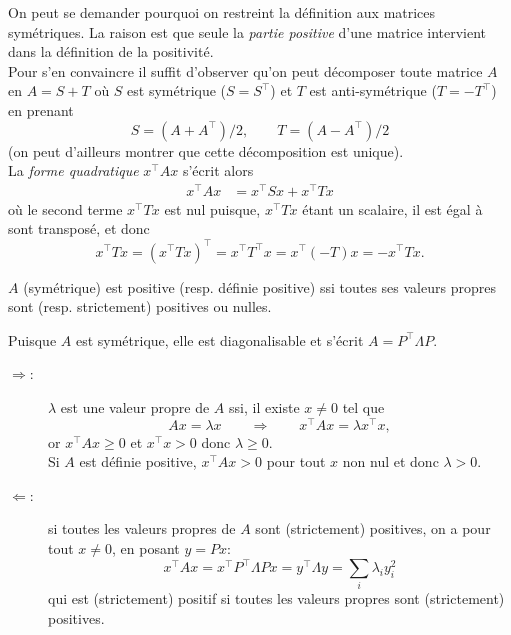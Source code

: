 \remark
On peut se demander pourquoi on restreint la définition aux matrices symétriques. La raison est que seule la {\em partie positive} d'une matrice intervient dans la définition de la positivité. \\
Pour s'en convaincre il suffit d'observer qu'on peut décomposer toute matrice $A$  en $A = S + T$ où $S$ est symétrique ($S = S^\top$) et $T$ est anti-symétrique ($T = -T^\top$) en prenant
$$
S = (A + A^\top) / 2, \qquad T = (A - A^\top) / 2
$$
(on peut d'ailleurs montrer que cette décomposition est unique). \\
La {\em forme quadratique} $x^\top A x$ s'écrit alors
\begin{align*}
  x^\top A x 
  & = x^\top S x + x^\top T x 
\end{align*}
où le second terme $x^\top T x$ est nul puisque, $x^\top T x$ étant un scalaire, il est égal à sont transposé, et donc
$$
x^\top T x = (x^\top T x)^\top = x^\top T^\top x = x^\top (- T) x = - x^\top T x.
$$

\begin{proposition}
  $A$ (symétrique) est positive (resp. définie positive) ssi toutes ses valeurs propres sont (resp. strictement) positives ou nulles. 
\end{proposition}

\proof
Puisque $A$ est symétrique, elle est diagonalisable et s'écrit $A = P^\top \Lambda P$.
\begin{description}
  \item[$\Rightarrow$:] $\lambda$ est une valeur propre de $A$ ssi, il existe $x \neq 0$ tel que
  $$
  Ax = \lambda x \qquad \Rightarrow \qquad x^\top A x = \lambda x^\top x,
  $$
  or $x^\top A x \geq 0$ et $x^\top x > 0$ donc $\lambda \geq 0$. \\
  Si $A$ est définie positive, $x^\top A x > 0$ pour tout $x$ non nul et donc $\lambda > 0$.
  \item[$\Leftarrow$:] si toutes les valeurs propres de $A$ sont (strictement) positives, on a pour tout $x \neq 0$, en posant $y = P x$:
  $$
  x^\top A x = x^\top P^\top \Lambda P x = y^\top \Lambda y = \sum_i \lambda_i y_i^2
  $$
  qui est (strictement) positif si toutes les valeurs propres sont (strictement) positives.
\end{description}
\eproof

% 

